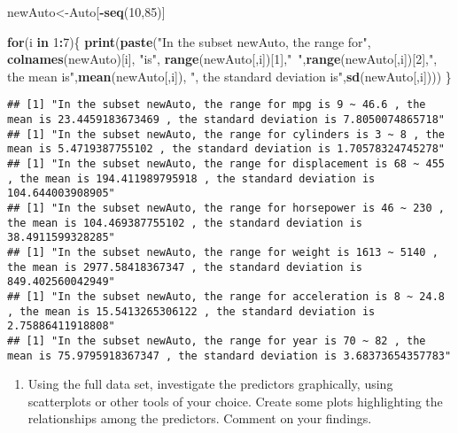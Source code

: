 \documentclass[]{article}
\newenvironment{Shaded}{\begin{snugshade}}{\end{snugshade}}
\newcommand{\KeywordTok}[1]{\textcolor[rgb]{0.13,0.29,0.53}{\textbf{#1}}}
\newcommand{\DecValTok}[1]{\textcolor[rgb]{0.00,0.00,0.81}{#1}}
\newcommand{\StringTok}[1]{\textcolor[rgb]{0.31,0.60,0.02}{#1}}
\newcommand{\ControlFlowTok}[1]{\textcolor[rgb]{0.13,0.29,0.53}{\textbf{#1}}}
\newcommand{\OperatorTok}[1]{\textcolor[rgb]{0.81,0.36,0.00}{\textbf{#1}}}
\newcommand{\NormalTok}[1]{#1}
\providecommand{\tightlist}{%
  \setlength{\itemsep}{0pt}\setlength{\parskip}{0pt}}
\begin{document}
\begin{Shaded}
\begin{Highlighting}[]
\NormalTok{newAuto<-Auto[}\OperatorTok{-}\KeywordTok{seq}\NormalTok{(}\DecValTok{10}\NormalTok{,}\DecValTok{85}\NormalTok{)]}

\ControlFlowTok{for}\NormalTok{(i }\ControlFlowTok{in} \DecValTok{1}\OperatorTok{:}\DecValTok{7}\NormalTok{)\{}
        \KeywordTok{print}\NormalTok{(}\KeywordTok{paste}\NormalTok{(}\StringTok{"In the subset newAuto, the range for"}\NormalTok{, }\KeywordTok{colnames}\NormalTok{(newAuto)[i], }\StringTok{"is"}\NormalTok{, }\KeywordTok{range}\NormalTok{(newAuto[,i])[}\DecValTok{1}\NormalTok{],}\StringTok{"~"}\NormalTok{,}\KeywordTok{range}\NormalTok{(newAuto[,i])[}\DecValTok{2}\NormalTok{],}\StringTok{", the mean is"}\NormalTok{,}\KeywordTok{mean}\NormalTok{(newAuto[,i]), }\StringTok{", the standard deviation is"}\NormalTok{,}\KeywordTok{sd}\NormalTok{(newAuto[,i])))}
\NormalTok{\}}
\end{Highlighting}
\end{Shaded}

\begin{verbatim}
## [1] "In the subset newAuto, the range for mpg is 9 ~ 46.6 , the mean is 23.4459183673469 , the standard deviation is 7.8050074865718"
## [1] "In the subset newAuto, the range for cylinders is 3 ~ 8 , the mean is 5.4719387755102 , the standard deviation is 1.70578324745278"
## [1] "In the subset newAuto, the range for displacement is 68 ~ 455 , the mean is 194.411989795918 , the standard deviation is 104.644003908905"
## [1] "In the subset newAuto, the range for horsepower is 46 ~ 230 , the mean is 104.469387755102 , the standard deviation is 38.4911599328285"
## [1] "In the subset newAuto, the range for weight is 1613 ~ 5140 , the mean is 2977.58418367347 , the standard deviation is 849.402560042949"
## [1] "In the subset newAuto, the range for acceleration is 8 ~ 24.8 , the mean is 15.5413265306122 , the standard deviation is 2.75886411918808"
## [1] "In the subset newAuto, the range for year is 70 ~ 82 , the mean is 75.9795918367347 , the standard deviation is 3.68373654357783"
\end{verbatim}

\begin{enumerate}
\def\labelenumi{(\alph{enumi})}
\setcounter{enumi}{4}
\tightlist
\item
  Using the full data set, investigate the predictors graphically, using
  scatterplots or other tools of your choice. Create some plots
  highlighting the relationships among the predictors. Comment on your
  findings.
\end{enumerate}
\end{document}
